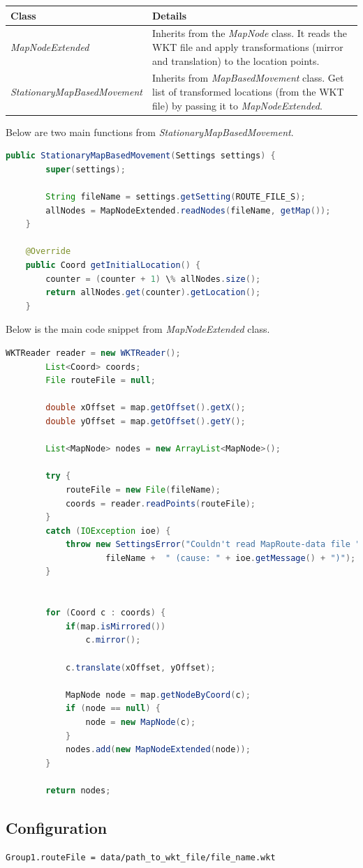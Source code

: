 	\begin{center}
	    \begin{tabular}{ | l | p{8.8cm} |}
    		\hline
    		\textbf{Class} & \textbf{Details} \\ \hline
    		\textit{MapNodeExtended} & Inherits from the \textit{MapNode} class. It reads the WKT file and apply transformations (mirror and translation) to the location points. \\ \hline
    		\textit{StationaryMapBasedMovement} & Inherits from \textit{MapBasedMovement} class. Get list of transformed locations (from the WKT file) by passing it to \textit{MapNodeExtended}. \\ \hline
    	\end{tabular}
    	 \label{tab:wktMapFiles} 

	\end{center}
\newpage
Below are two main functions from \textit{StationaryMapBasedMovement}.
\vspace{3mm}
\begin{lstlisting}[language=java]
	public StationaryMapBasedMovement(Settings settings) {
		super(settings);

		String fileName = settings.getSetting(ROUTE_FILE_S);
		allNodes = MapNodeExtended.readNodes(fileName, getMap());		
	}
		
	@Override
	public Coord getInitialLocation() {
		counter = (counter + 1) \% allNodes.size();
		return allNodes.get(counter).getLocation();
	}
\end{lstlisting}

\vspace{10mm}
Below is the main code snippet from \textit{MapNodeExtended} class.
\vspace{3mm}
\begin{lstlisting}[language=java]
		WKTReader reader = new WKTReader();
		List<Coord> coords;
		File routeFile = null;
		
		double xOffset = map.getOffset().getX();
		double yOffset = map.getOffset().getY();

		List<MapNode> nodes = new ArrayList<MapNode>();

		try {
			routeFile = new File(fileName);
			coords = reader.readPoints(routeFile);
		}
		catch (IOException ioe) {
			throw new SettingsError("Couldn't read MapRoute-data file " + 
					fileName + 	" (cause: " + ioe.getMessage() + ")");
		}


		for (Coord c : coords) {			
			if(map.isMirrored())
				c.mirror();
			
			c.translate(xOffset, yOffset);
			
			MapNode node = map.getNodeByCoord(c);
			if (node == null) {
				node = new MapNode(c);
			}
			nodes.add(new MapNodeExtended(node));			
		}
		
		return nodes;
\end{lstlisting}
\vspace{8mm}
\subsection{Configuration}
\begin{lstlisting}[language=bash]
Group1.routeFile = data/path_to_wkt_file/file_name.wkt
\end{lstlisting}